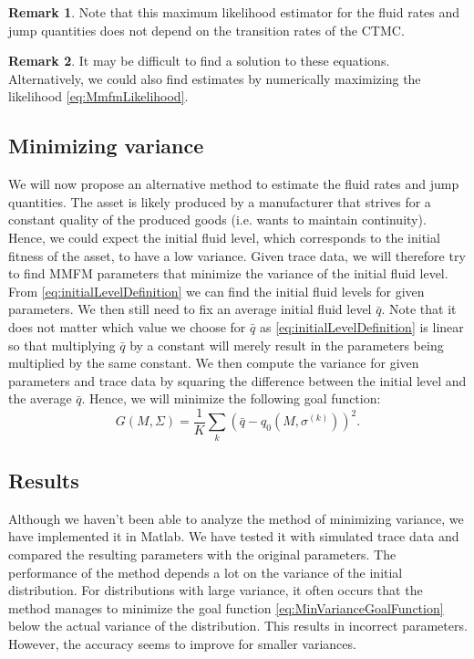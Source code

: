 \documentclass[a4paper]{thesis}
\theoremstyle{definition}
\newtheorem{remark}{Remark}[chapter]
\begin{document}
\begin{remark}
	Note that this maximum likelihood estimator for the fluid rates and jump quantities does not depend on the transition rates of the CTMC.
\end{remark}

\begin{remark}
	It may be difficult to find a solution to these equations.
	Alternatively, we could also find estimates by numerically maximizing the likelihood \eqref{eq:MmfmLikelihood}. 
\end{remark}

\subsection{Minimizing variance}
We will now propose an alternative method to estimate the fluid rates and jump quantities.
The asset is likely produced by a manufacturer that strives for a constant quality of the produced goods (i.e. wants to maintain continuity).
Hence, we could expect the initial fluid level, which corresponds to the initial fitness of the asset, to have a low variance.
Given trace data, we will therefore try to find MMFM parameters that minimize the variance of the initial fluid level.
From \eqref{eq:initialLevelDefinition} we can find the initial fluid levels for given parameters.
We then still need to fix an average initial fluid level $\bar q$.
Note that it does not matter which value we choose for $\bar q$ as \eqref{eq:initialLevelDefinition} is linear so that multiplying $\bar q$ by a constant will merely result in the parameters being multiplied by the same constant.
We then compute the variance for given parameters and trace data by squaring the difference between the initial level and the average $\bar q$.
Hence, we will minimize the following goal function:
\begin{equation}\label{eq:MinVarianceGoalFunction}
G(M,\Sigma)=\frac1K\sum_k \left(\bar q - q_0\left(M,\sigma^{(k)}\right)\right)^2.
\end{equation}

\subsection{Results}
Although we haven't been able to analyze the method of minimizing variance, we have implemented it in Matlab.
We have tested it with simulated trace data and compared the resulting parameters with the original parameters.
The performance of the method depends a lot on the variance of the initial distribution.
For distributions with large variance, it often occurs that the method manages to minimize the goal function \eqref{eq:MinVarianceGoalFunction} below the actual variance of the distribution.
This results in incorrect parameters.
However, the accuracy seems to improve for smaller variances. 
\end{document}
